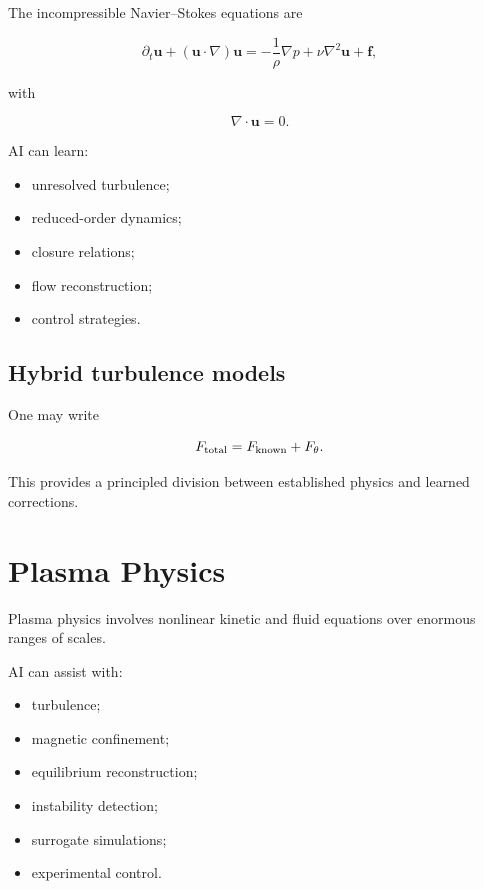 \documentclass[11pt,a4paper,oneside]{book}
\begin{document}
The incompressible Navier--Stokes equations are

\begin{equation}
\partial_t\mathbf{u}
+
(\mathbf{u}\cdot\nabla)\mathbf{u}
=
-\frac{1}{\rho}\nabla p
+
\nu\nabla^2\mathbf{u}
+
\mathbf{f},
\end{equation}

with

\begin{equation}
\nabla\cdot\mathbf{u}=0.
\end{equation}

AI can learn:

\begin{itemize}
\item unresolved turbulence;
\item reduced-order dynamics;
\item closure relations;
\item flow reconstruction;
\item control strategies.
\end{itemize}

\section{Hybrid turbulence models}

One may write

\begin{equation}
F_{\rm total}
=
F_{\rm known}
+
F_\theta.
\end{equation}

This provides a principled division between established physics and learned
corrections.

\chapter{Plasma Physics}

Plasma physics involves nonlinear kinetic and fluid equations over enormous
ranges of scales.

AI can assist with:

\begin{itemize}
\item turbulence;
\item magnetic confinement;
\item equilibrium reconstruction;
\item instability detection;
\item surrogate simulations;
\item experimental control.
\end{itemize}
\end{document}
